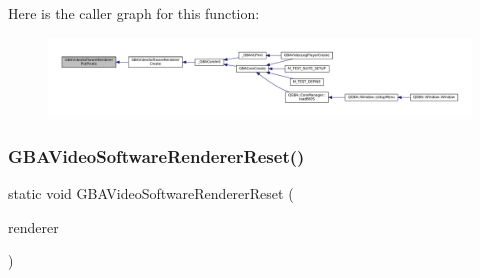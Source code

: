 Here is the caller graph for this function\+:
\nopagebreak
\begin{figure}[H]
\begin{center}
\leavevmode
\includegraphics[width=350pt]{video-software_8c_a6b275066e87074226e4be5673be71dbc_icgraph}
\end{center}
\end{figure}
\mbox{\label{video-software_8c_ad9b2accf87f8b85ec8976ac94bc5b6d1}} 
\subsubsection{\texorpdfstring{G\+B\+A\+Video\+Software\+Renderer\+Reset()}{GBAVideoSoftwareRendererReset()}}
{\footnotesize\ttfamily static void G\+B\+A\+Video\+Software\+Renderer\+Reset (\begin{DoxyParamCaption}\item[{struct G\+B\+A\+Video\+Renderer $\ast$}]{renderer }\end{DoxyParamCaption})\hspace{0.3cm}{\ttfamily [static]}}

